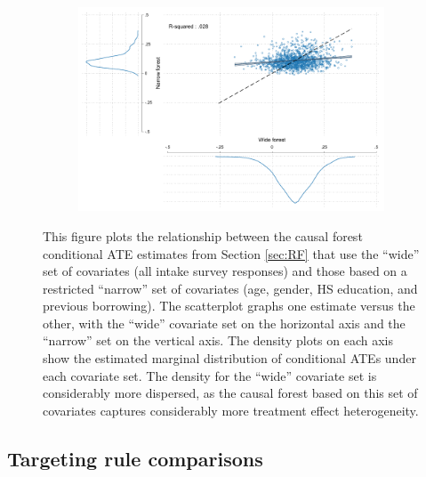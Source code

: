 \begin{figure}[H]
    \caption{Conditional ATEs from ``wide'' and ``narrow'' covariate sets}
    \label{wide_narrow_forests}
    \begin{center}
    \begin{subfigure}{0.75\textwidth}
        \centering
        \includegraphics[width=\textwidth]{Figuras/scatter_hist_wide_narrow.pdf}
    \end{subfigure}
    \end{center}
      \scriptsize  This figure plots the relationship between the causal forest conditional ATE estimates from Section \ref{sec:RF} that use the ``wide'' set of covariates (all intake survey responses) and those based on a restricted ``narrow'' set of covariates (age, gender, HS education, and previous borrowing). The scatterplot graphs one estimate versus the other, with the ``wide'' covariate set on the horizontal axis and the ``narrow'' set on the vertical axis. The density plots on each axis show the estimated marginal distribution of conditional ATEs under each covariate set. The density for the ``wide'' covariate set is considerably more dispersed, as the causal forest based on this set of covariates captures considerably more treatment effect heterogeneity.

\end{figure}






\newpage
\subsection{Targeting rule comparisons}


